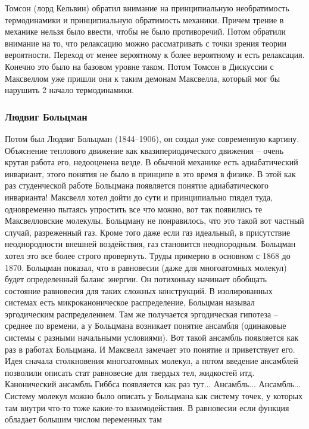 \documentclass[a4paper, 12pt]{article}
\begin{document}
Томсон (лорд Кельвин) обратил внимание на принципиальную необратимость 
термодинамики и принципиальную обратимость механики. Причем трение 
в механике нельзя было ввести, чтобы не было противоречий. Потом 
обратили внимание на то, что релаксацию можно рассматривать с точки 
зрения теории вероятности. Переход от менее вероятному к более 
вероятному и есть релаксация. Конечно это было на базовом уровне таком. 
Потом Томсон в Дискуссии с Максвеллом уже пришли они к таким демонам 
Максвелла, который мог бы нарушить 2 начало термодинамики.

\subsubsection{Людвиг Больцман}

Потом был Людвиг Больцман (1844--1906), он создал уже современную 
картину. Объяснение теплового движение как квазипериодического движения 
-- очень крутая работа его, недооценена везде. В обычной механике есть 
адиабатический инвариант, этого понятия не было в принципе в это время 
в физике. В этой как раз студенческой работе Больцмана появляется 
понятие адиабатического инварианта! Максвелл хотел дойти до сути 
и принципиально глядел туда, одновременно пытаясь упростить все что 
можно, вот так появились те Максвелловские молекулы. Больцману не 
понравилось, что это такой вот частный случай, разреженный газ. Кроме 
того даже если газ идеальный, в присутствие неоднородности внешней 
воздействия, газ становится неоднородным. Больцман хотел это все более 
строго провернуть. Труды примерно в основном с 1868 до 1870. Больцман 
показал, что в равновесии (даже для многоатомных молекул) будет 
определенный баланс энергии. Он потихоньку начинает обобщать состояние 
равновесия для таких сложных конструкций. В изолированных системах есть 
микроканоническое распределение, Больцман называл эргодическим 
распределением. Там же получается эргодическая гипотеза -- среднее по 
времени, а у Больцмана возникает понятие ансамбля (одинаковые системы 
с разными начальными условиями). Вот такой ансамбль появляется как раз 
в работах Больцмана. И Максвелл замечает это понятие и приветствует его. 
Идея сначала столкновения многоатомных молекул, а потом введение 
ансамблей позволили описать стат равновесие для твердых тел, жидкостей 
итд. Канонический ансамбль Гиббса появляется как раз тут... Ансамбль... 
Ансамбль... Систему молекул можно было описать у Больцмана как систему 
точек, у которых там внутри что-то тоже какие-то взаимодействия. 
В равновесии если функция обладает большим числом переменных там 
\end{document}
